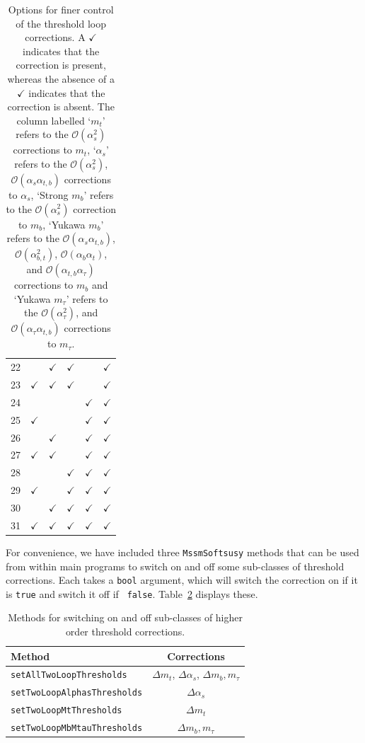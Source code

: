 \documentclass[final,3p,times,pdflatex]{elsarticle}
\begin{document}
\begin{table}
\begin{center}
\begin{tabular}{|c|ccccc|}
22 & &$\checkmark$ & $\checkmark$ & &$\checkmark$ \\
23 &$\checkmark$ &$\checkmark$ & $\checkmark$ & &$\checkmark$ \\
24 & & & &$\checkmark$ &$\checkmark$ \\
25 &$\checkmark$ & & &$\checkmark$ &$\checkmark$ \\
26 & &$\checkmark$ & &$\checkmark$ &$\checkmark$ \\
27 &$\checkmark$ &$\checkmark$ & &$\checkmark$ &$\checkmark$ \\
28 & & &$\checkmark$ &$\checkmark$ &$\checkmark$ \\
29 & $\checkmark$& &$\checkmark$ &$\checkmark$ &$\checkmark$ \\
30 & &$\checkmark$ &$\checkmark$ &$\checkmark$ &$\checkmark$ \\
31 &$\checkmark$ &$\checkmark$ &$\checkmark$ &$\checkmark$ &$\checkmark$ \\
\hline 
\end{tabular}
\end{center}
\caption{Options for finer control of the threshold loop corrections. 
A $\checkmark$ indicates that the correction is present, whereas the absence
of a $\checkmark$ indicates that the correction is absent. 
The column labelled `$m_t$' refers
to the $\mathcal O(\alpha_s^2)$ corrections to $m_t$, 
`$\alpha_s$' refers to the $\mathcal O(\alpha_s^2)$, $\mathcal O(\alpha_s \alpha_{t,b})$
  corrections to $\alpha_s$, 
`Strong $m_b$' refers to the $\mathcal O(\alpha_s^2)$ correction to $m_b$, 
`Yukawa $m_b$' refers to the $\mathcal O(\alpha_s \alpha_{t,b})$,$\mathcal O(\alpha_{b,t}^2)$, $\mathcal O(\alpha_b \alpha_t)$,
and $\mathcal O(\alpha_{t,b} \alpha_\tau)$ corrections to $m_b$ and
`Yukawa $m_\tau$' refers to the $\mathcal O(\alpha_\tau^2)$, and $\mathcal O(\alpha_\tau
\alpha_{t,b})$ corrections to $m_\tau$.
\label{tab:bitset}}
\end{table}
For convenience, we have included three {\tt MssmSoftsusy} methods that can be
used from within main programs to switch on and off some sub-classes of
threshold corrections. Each takes a {\tt bool} argument, which will switch the
correction on if it is {\tt true} and switch it off if {\tt
  false}. Table~\ref{tab:methods} displays these. 
\begin{table}
\begin{center}
\begin{tabular}{|lc|}\hline
Method & Corrections \\ \hline
{\tt setAllTwoLoopThresholds} & $\Delta m_t$, $\Delta \alpha_s$, $\Delta
m_{b},m_\tau$ \\
{\tt setTwoLoopAlphasThresholds} & $\Delta \alpha_s$ \\
{\tt setTwoLoopMtThresholds} & $\Delta m_t$ \\
{\tt setTwoLoopMbMtauThresholds} & $\Delta m_b, m_\tau$ \\
\hline\end{tabular}
\end{center}
\caption{Methods for switching on and off sub-classes of higher order
  threshold corrections. \label{tab:methods}}
\end{table}



\end{document}
